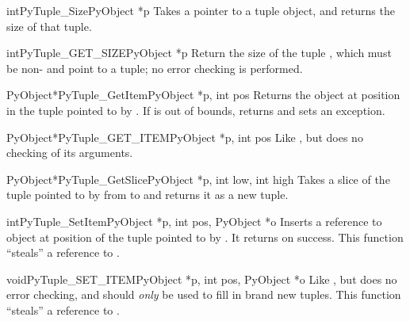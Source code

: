 \documentclass{manual}
\begin{document}
\begin{cfuncdesc}{int}{PyTuple_Size}{PyObject *p}
Takes a pointer to a tuple object, and returns the size
of that tuple.
\end{cfuncdesc}

\begin{cfuncdesc}{int}{PyTuple_GET_SIZE}{PyObject *p}
Return the size of the tuple , which must be non-\NULL{} and
point to a tuple; no error checking is performed.
\end{cfuncdesc}

\begin{cfuncdesc}{PyObject*}{PyTuple_GetItem}{PyObject *p, int pos}
Returns the object at position  in the tuple pointed
to by .  If  is out of bounds, returns \NULL{} and
sets an  exception.
\end{cfuncdesc}

\begin{cfuncdesc}{PyObject*}{PyTuple_GET_ITEM}{PyObject *p, int pos}
Like , but does no checking of its
arguments.
\end{cfuncdesc}

\begin{cfuncdesc}{PyObject*}{PyTuple_GetSlice}{PyObject *p,
                                               int low, int high}
Takes a slice of the tuple pointed to by  from
 to  and returns it as a new tuple.
\end{cfuncdesc}

\begin{cfuncdesc}{int}{PyTuple_SetItem}{PyObject *p,
                                        int pos, PyObject *o}
Inserts a reference to object  at position  of
the tuple pointed to by . It returns  on success.
  This function ``steals'' a reference to .
\end{cfuncdesc}

\begin{cfuncdesc}{void}{PyTuple_SET_ITEM}{PyObject *p,
                                          int pos, PyObject *o}
Like , but does no error checking, and
should \emph{only} be used to fill in brand new tuples.
  This function ``steals'' a reference to .
\end{cfuncdesc}
\end{document}
